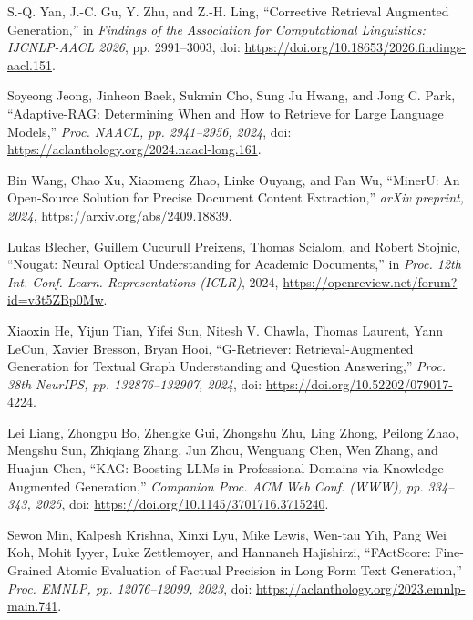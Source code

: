  S.-Q. Yan, J.-C. Gu, Y. Zhu, and Z.-H. Ling, ``Corrective Retrieval Augmented Generation,'' in \emph{Findings of the Association for Computational Linguistics: IJCNLP-AACL 2026}, pp. 2991--3003, doi: \url{https://doi.org/10.18653/2026.findings-aacl.151}.

 Soyeong Jeong, Jinheon Baek, Sukmin Cho, Sung Ju Hwang, and Jong C. Park, ``Adaptive-RAG: Determining When and How to Retrieve for Large Language Models,'' \emph{Proc. NAACL, pp. 2941--2956, 2024}, doi: \url{https://aclanthology.org/2024.naacl-long.161}.

 Bin Wang, Chao Xu, Xiaomeng Zhao, Linke Ouyang, and Fan Wu, ``MinerU: An Open-Source Solution for Precise Document Content Extraction,'' \emph{arXiv preprint, 2024}, \url{https://arxiv.org/abs/2409.18839}.

 Lukas Blecher, Guillem Cucurull Preixens, Thomas Scialom, and Robert Stojnic, ``Nougat: Neural Optical Understanding for Academic Documents,'' in \emph{Proc. 12th Int. Conf. Learn. Representations (ICLR)}, 2024, \url{https://openreview.net/forum?id=v3t5ZBp0Mw}.

 Xiaoxin He, Yijun Tian, Yifei Sun, Nitesh V. Chawla, Thomas Laurent, Yann LeCun, Xavier Bresson, Bryan Hooi, ``G-Retriever: Retrieval-Augmented Generation for Textual Graph Understanding and Question Answering,'' \emph{Proc. 38th NeurIPS, pp. 132876--132907, 2024}, doi: \url{https://doi.org/10.52202/079017-4224}.

 Lei Liang, Zhongpu Bo, Zhengke Gui, Zhongshu Zhu, Ling Zhong, Peilong Zhao, Mengshu Sun, Zhiqiang Zhang, Jun Zhou, Wenguang Chen, Wen Zhang, and Huajun Chen, ``KAG: Boosting LLMs in Professional Domains via Knowledge Augmented Generation,'' \emph{Companion Proc. ACM Web Conf. (WWW), pp. 334--343, 2025}, doi: \url{https://doi.org/10.1145/3701716.3715240}.

 Sewon Min, Kalpesh Krishna, Xinxi Lyu, Mike Lewis, Wen-tau Yih, Pang Wei Koh, Mohit Iyyer, Luke Zettlemoyer, and Hannaneh Hajishirzi, ``FActScore: Fine-Grained Atomic Evaluation of Factual Precision in Long Form Text Generation,'' \emph{Proc. EMNLP, pp. 12076--12099, 2023}, doi: \url{https://aclanthology.org/2023.emnlp-main.741}.
